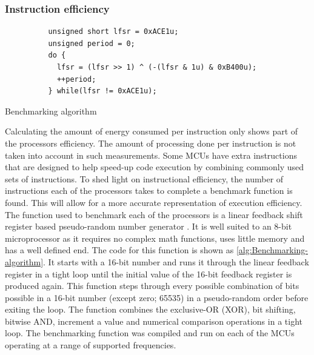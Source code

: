     \subsubsection{Instruction efficiency}

      \begin{algorithm}
        \begin{lstlisting}
          unsigned short lfsr = 0xACE1u;
          unsigned period = 0;
          do {
            lfsr = (lfsr >> 1) ^ (-(lfsr & 1u) & 0xB400u);
            ++period;
          } while(lfsr != 0xACE1u);
        \end{lstlisting}
        \caption{\label{alg:Benchmarking-algorithm}Benchmarking algorithm}
      \end{algorithm}

      Calculating the amount of energy consumed per instruction only shows part of the processors efficiency.
      The amount of processing done per instruction is not taken into account in such measurements.
      Some MCUs have extra instructions that are designed to help speed-up code execution by combining commonly used sets of instructions.
      To shed light on instructional efficiency, the number of instructions each of the processors takes to complete a benchmark function is found.
      This will allow for a more accurate representation of execution efficiency.
      The function used to benchmark each of the processors is a linear feedback shift register based pseudo-random number generator \cite{LinearFeedbackRegister}.
      It is well suited to an 8-bit microprocessor as it requires no complex math functions, uses little memory and has a well defined end.
      The code for this function is shown as \cref{alg:Benchmarking-algorithm}.
      It starts with a 16-bit number and runs it through the linear feedback register in a tight loop until the initial value of the 16-bit feedback register is produced again.
      This function steps through every possible combination of bits possible in a 16-bit number (except zero; 65535) in a pseudo-random order before exiting the loop.
      The function combines the exclusive-OR (XOR), bit shifting, bitwise AND, increment a value and numerical comparison operations in a tight loop.
      The benchmarking function was compiled and run on each of the MCUs operating at a range of supported frequencies.

